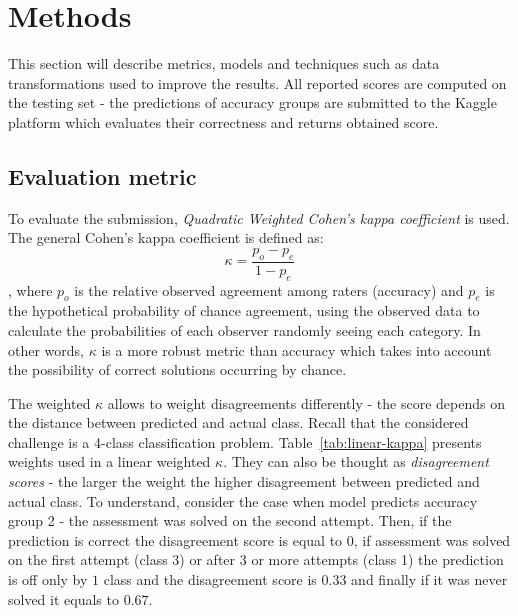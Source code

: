 \documentclass[fleqn,10pt]{SelfArx} %
\begin{document}


\section{Methods}

This section will describe metrics, models and techniques such as data transformations used to improve the results.
All reported scores are computed on the testing set - the predictions of accuracy groups are submitted to the Kaggle platform which evaluates their correctness and returns obtained score.

\subsection{Evaluation metric}

To evaluate the submission, \textit{Quadratic Weighted Cohen's kappa coefficient} is used.
The general Cohen's kappa coefficient is defined as:
\begin{equation}
    \kappa = \frac{p_o - p_e}{1 - p_e}
    \label{eq:kappa}
\end{equation}
, where $p_o$ is the relative observed agreement among raters (accuracy) and $p_e$ is the hypothetical probability of chance agreement, using the observed data to calculate the probabilities of each observer randomly seeing each category.
In other words, $\kappa$ is a more robust metric than accuracy which takes into account the possibility of correct solutions occurring by chance.

The weighted $\kappa$ allows to weight disagreements differently - the score depends on the distance between predicted and actual class.
Recall that the considered challenge is a 4-class classification problem.
Table~\ref{tab:linear-kappa} presents weights used in a linear weighted $\kappa$.
They can also be thought as \textit{disagreement scores} - the larger the weight the higher disagreement between predicted and actual class.
To understand, consider the case when model predicts accuracy group 2 - the assessment was solved on the second attempt.
Then, if the prediction is correct the disagreement score is equal to $0$, if assessment was solved on the first attempt (class 3) or after 3 or more attempts (class 1) the prediction is off only by $1$ class and the disagreement score is $0.33$ and finally if it was never solved it equals to $0.67$.
\end{document}
